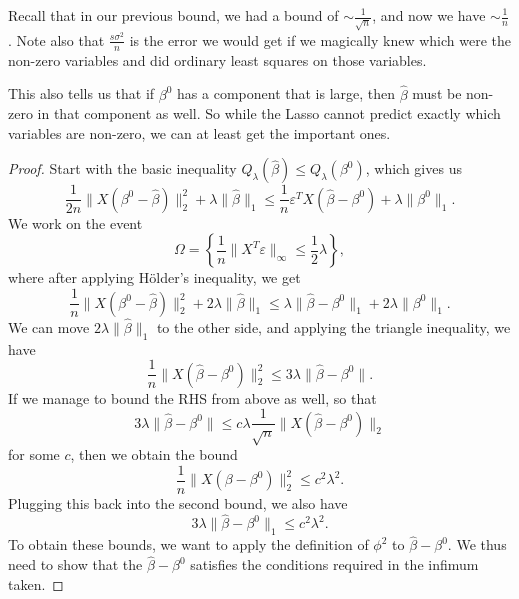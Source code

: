 \documentclass[a4paper]{article}
\begin{document}
Recall that in our previous bound, we had a bound of $\sim \frac{1}{\sqrt{n}}$, and now we have $\sim \frac{1}{n}$. Note also that $\frac{s \sigma^2}{n}$ is the error we would get if we magically knew which were the non-zero variables and did ordinary least squares on those variables.

This also tells us that if $\beta^0$ has a component that is large, then $\hat{\beta}$ must be non-zero in that component as well. So while the Lasso cannot predict exactly which variables are non-zero, we can at least get the important ones.

\begin{proof}
  Start with the basic inequality $Q_\lambda(\hat{\beta}) \leq Q_\lambda(\beta^0)$, which gives us
  \[
    \frac{1}{2n} \|X (\beta^0 - \hat{\beta})\|_2^2 + \lambda \|\hat{\beta}\|_1 \leq \frac{1}{n} \varepsilon^T X(\hat{\beta} - \beta^0) + \lambda \|\beta^0\|_1.
  \]
  We work on the event
  \[
    \Omega = \left\{\frac{1}{n} \|X^T \varepsilon \|_\infty \leq \frac{1}{2} \lambda\right\},
  \]
  where after applying H\"older's inequality, we get
  \[
    \frac{1}{n} \|X(\beta^0 - \hat{\beta})\|_2^2 + 2 \lambda \|\hat{\beta}\|_1 \leq \lambda \|\hat{\beta} - \beta^0\|_1 + 2 \lambda \|\beta^0\|_1.
  \]
  We can move $2 \lambda \|\hat{\beta}\|_1$ to the other side, and applying the triangle inequality, we have
  \[
    \frac{1}{n} \|X(\hat{\beta} - \beta^0)\|_2^2 \leq 3 \lambda \|\hat{\beta} - \beta^0\|.
  \]
  If we manage to bound the RHS from above as well, so that
  \[
    3\lambda \|\hat{\beta} - \beta^0\| \leq c \lambda \frac{1}{\sqrt{n}} \|X (\hat{\beta} - \beta^0)\|_2
  \]
  for some $c$, then we obtain the bound
  \[
    \frac{1}{n} \|X (\beta - \beta^0)\|_2^2 \leq c^2 \lambda^2.
  \]
  Plugging this back into the second bound, we also have
  \[
    3 \lambda \|\hat{\beta} - \beta^0\|_1 \leq c^2 \lambda^2.
  \]
  To obtain these bounds, we want to apply the definition of $\phi^2$ to $\hat{\beta} - \beta^0$. We thus need to show that the $\hat{\beta} - \beta^0$ satisfies the conditions required in the infimum taken.


\end{proof}
\end{document}
